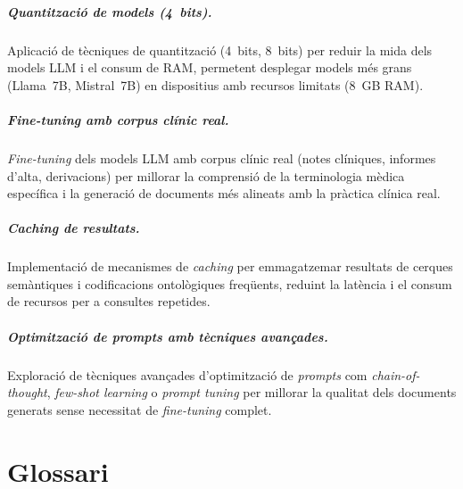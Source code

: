 \documentclass[CAT]{TFUOC}%
\begin{document}
\paragraph{Quantització de models (4~bits).}
Aplicació de tècniques de quantització (4~bits, 8~bits) per reduir la mida dels models LLM i el consum de RAM, permetent desplegar models més grans (Llama~7B, Mistral~7B) en dispositius amb recursos limitats (8~GB RAM).

\paragraph{\textit{Fine-tuning} amb corpus clínic real.}
\textit{Fine-tuning} dels models LLM amb corpus clínic real (notes clíniques, informes d'alta, derivacions) per millorar la comprensió de la terminologia mèdica específica i la generació de documents més alineats amb la pràctica clínica real.

\paragraph{\textit{Caching} de resultats.}
Implementació de mecanismes de \textit{caching} per emmagatzemar resultats de cerques semàntiques i codificacions ontològiques freqüents, reduint la latència i el consum de recursos per a consultes repetides.

\paragraph{Optimització de \textit{prompts} amb tècniques avançades.}
Exploració de tècniques avançades d'optimització de \textit{prompts} com \textit{chain-of-thought}, \textit{few-shot learning} o \textit{prompt tuning} per millorar la qualitat dels documents generats sense necessitat de \textit{fine-tuning} complet.


\chapter{Glossari}
\end{document}
